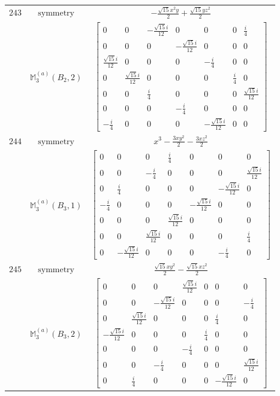 \documentclass[fleqn,8pt,landscape]{jsarticle}
\begin{document}
\begin{longtable}{ccc}
$ 243 $ & $ \text{symmetry} $ & $ - \frac{\sqrt{15} x^{2} y}{2} + \frac{\sqrt{15} y z^{2}}{2} $ \\
$  $ & $ \mathbb{M}_{3}^{(a)}(B_{2},2) $ & $ \begin{bmatrix} 0 & 0 & - \frac{\sqrt{15} i}{12} & 0 & 0 & 0 & \frac{i}{4} \\ 0 & 0 & 0 & - \frac{\sqrt{15} i}{12} & 0 & 0 & 0 \\ \frac{\sqrt{15} i}{12} & 0 & 0 & 0 & - \frac{i}{4} & 0 & 0 \\ 0 & \frac{\sqrt{15} i}{12} & 0 & 0 & 0 & \frac{i}{4} & 0 \\ 0 & 0 & \frac{i}{4} & 0 & 0 & 0 & \frac{\sqrt{15} i}{12} \\ 0 & 0 & 0 & - \frac{i}{4} & 0 & 0 & 0 \\ - \frac{i}{4} & 0 & 0 & 0 & - \frac{\sqrt{15} i}{12} & 0 & 0 \end{bmatrix} $ \\ \hline
$ 244 $ & $ \text{symmetry} $ & $ x^{3} - \frac{3 x y^{2}}{2} - \frac{3 x z^{2}}{2} $ \\
$  $ & $ \mathbb{M}_{3}^{(a)}(B_{3},1) $ & $ \begin{bmatrix} 0 & 0 & 0 & \frac{i}{4} & 0 & 0 & 0 \\ 0 & 0 & - \frac{i}{4} & 0 & 0 & 0 & \frac{\sqrt{15} i}{12} \\ 0 & \frac{i}{4} & 0 & 0 & 0 & - \frac{\sqrt{15} i}{12} & 0 \\ - \frac{i}{4} & 0 & 0 & 0 & - \frac{\sqrt{15} i}{12} & 0 & 0 \\ 0 & 0 & 0 & \frac{\sqrt{15} i}{12} & 0 & 0 & 0 \\ 0 & 0 & \frac{\sqrt{15} i}{12} & 0 & 0 & 0 & \frac{i}{4} \\ 0 & - \frac{\sqrt{15} i}{12} & 0 & 0 & 0 & - \frac{i}{4} & 0 \end{bmatrix} $ \\ \hline
$ 245 $ & $ \text{symmetry} $ & $ \frac{\sqrt{15} x y^{2}}{2} - \frac{\sqrt{15} x z^{2}}{2} $ \\
$  $ & $ \mathbb{M}_{3}^{(a)}(B_{3},2) $ & $ \begin{bmatrix} 0 & 0 & 0 & \frac{\sqrt{15} i}{12} & 0 & 0 & 0 \\ 0 & 0 & - \frac{\sqrt{15} i}{12} & 0 & 0 & 0 & - \frac{i}{4} \\ 0 & \frac{\sqrt{15} i}{12} & 0 & 0 & 0 & \frac{i}{4} & 0 \\ - \frac{\sqrt{15} i}{12} & 0 & 0 & 0 & \frac{i}{4} & 0 & 0 \\ 0 & 0 & 0 & - \frac{i}{4} & 0 & 0 & 0 \\ 0 & 0 & - \frac{i}{4} & 0 & 0 & 0 & \frac{\sqrt{15} i}{12} \\ 0 & \frac{i}{4} & 0 & 0 & 0 & - \frac{\sqrt{15} i}{12} & 0 \end{bmatrix} $ \\ \hline

\end{longtable}
\end{document}
